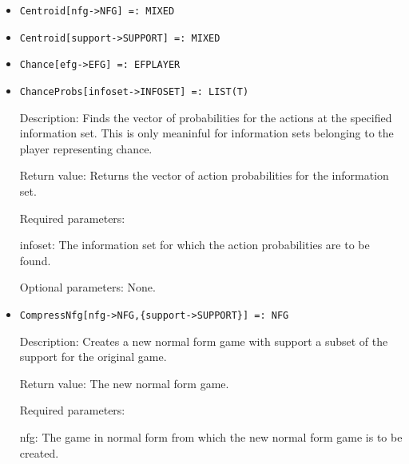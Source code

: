 \begin{itemize}
\item
\protect \large \begin{verbatim}
Centroid[nfg->NFG] =: MIXED
\end{verbatim}\normalsize

\item
\protect \large \begin{verbatim}
Centroid[support->SUPPORT] =: MIXED
\end{verbatim}\normalsize

\item
\protect \large \begin{verbatim}
Chance[efg->EFG] =: EFPLAYER
\end{verbatim}\normalsize

\item
\protect \large \begin{verbatim}
ChanceProbs[infoset->INFOSET] =: LIST(T)
\end{verbatim}\normalsize

\bd
\item
[Description:] Finds the vector of probabilities for the actions at
the specified information set.  This is only meaninful for 
information sets belonging to the player representing chance.
\item
[Return value:] Returns the vector of action probabilities for the
information set.
\item
[Required parameters:]\hfil\null
	
\bd
\item
[infoset:] The information set for which the action probabilities are to
be found.
\ed

\item
[Optional parameters:] None.
\ed

\item
\protect \large \begin{verbatim}
CompressNfg[nfg->NFG,{support->SUPPORT}] =: NFG
\end{verbatim}\normalsize

\bd
\item
[Description:] Creates a new normal form game with support a subset of
the support for the original game.  
\item
[Return value:] The new normal form game.
\item
[Required parameters:]\hfil\null
	
\bd
\item
[nfg:] The game in normal form from which the new normal form game
is to be created.
\ed


\end{itemize}
